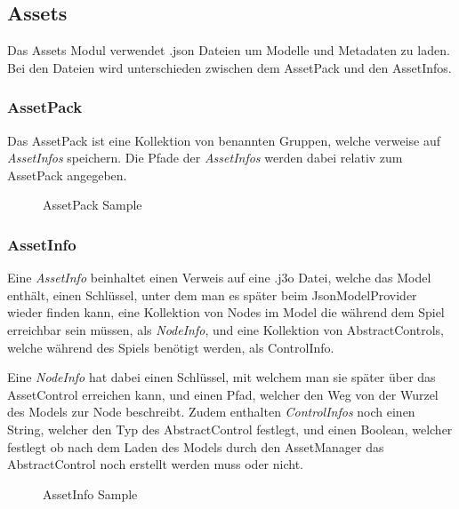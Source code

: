 \subsection{Assets}

Das Assets Modul verwendet .json Dateien um Modelle und Metadaten zu laden.
Bei den Dateien wird unterschieden zwischen dem AssetPack und den AssetInfos.\par

\subsubsection{AssetPack}

Das AssetPack ist eine Kollektion von benannten Gruppen, welche verweise auf \textit{AssetInfos} speichern.
Die Pfade der \textit{AssetInfos} werden dabei relativ zum AssetPack angegeben. \par
\begin{figure}[htbp]
    \centering
    
    \caption{AssetPack Sample}
\end{figure}
\pagebreak

\subsubsection{AssetInfo}

Eine \textit{AssetInfo} beinhaltet einen Verweis auf eine .j3o Datei, welche das Model enthält,
einen Schlüssel, unter dem man es später beim JsonModelProvider wieder finden kann,
eine Kollektion von Nodes im Model die während dem Spiel erreichbar sein müssen, als \textit{NodeInfo},
und eine Kollektion von AbstractControls, welche während des Spiels benötigt werden, als ControlInfo. \par
Eine \textit{NodeInfo} hat dabei einen Schlüssel, mit welchem man sie später über das AssetControl erreichen kann,
und einen Pfad, welcher den Weg von der Wurzel des Models zur Node beschreibt. Zudem enthalten \textit{ControlInfos}
noch einen String, welcher den Typ des AbstractControl festlegt, und einen Boolean, welcher festlegt ob nach dem
Laden des Models durch den AssetManager das AbstractControl noch erstellt werden muss oder nicht. \par
\begin{figure}[htbp]
    \centering
    
    \caption{AssetInfo Sample}
\end{figure}
\pagebreak